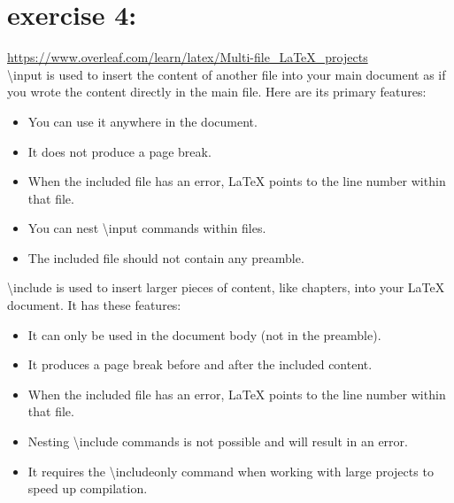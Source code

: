 \section{exercise 4:}
\url{https://www.overleaf.com/learn/latex/Multi-file_LaTeX_projects}
\\
\textbackslash input is used to insert the content of another file into your main document as if you wrote the content directly in the main file. Here are its primary features:
\begin{itemize}
	\item You can use it anywhere in the document.

	\item It does not produce a page break.
	\item When the included file has an error, LaTeX points to the line number within that file.

	\item You can nest \textbackslash input commands within files.

	\item The included file should not contain any preamble.
\end{itemize}

\noindent
\textbackslash include is used to insert larger pieces of content, like chapters, into your LaTeX document. It has these features:

\begin{itemize}
	\item It can only be used in the document body (not in the preamble).
	\item It produces a page break before and after the included content.
	\item When the included file has an error, LaTeX points to the line number within that file.
	\item Nesting \textbackslash include commands is not possible and will result in an error.
	\item It requires the \textbackslash includeonly command when working with large projects to speed up compilation.
\end{itemize}
